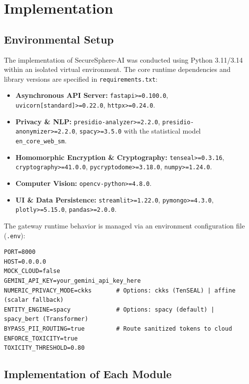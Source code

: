 \documentclass[12pt,a4paper,oneside]{report}
\numberwithin{equation}{chapter}
\begin{document}
\chapter{Implementation}

\section{Environmental Setup}
The implementation of SecureSphere-AI was conducted using Python 3.11/3.14 within an isolated virtual environment. The core runtime dependencies and library versions are specified in \texttt{requirements.txt}:
\begin{itemize}[leftmargin=*]
    \item \textbf{Asynchronous API Server:} \texttt{fastapi>=0.100.0}, \texttt{uvicorn[standard]>=0.22.0}, \texttt{httpx>=0.24.0}.
    \item \textbf{Privacy \& NLP:} \texttt{presidio-analyzer>=2.2.0}, \texttt{presidio-anonymizer>=2.2.0}, \texttt{spacy>=3.5.0} with the statistical model \texttt{en\_core\_web\_sm}.
    \item \textbf{Homomorphic Encryption \& Cryptography:} \texttt{tenseal>=0.3.16}, \texttt{cryptography>=41.0.0}, \texttt{pycryptodome>=3.18.0}, \texttt{numpy>=1.24.0}.
    \item \textbf{Computer Vision:} \texttt{opencv-python>=4.8.0}.
    \item \textbf{UI \& Data Persistence:} \texttt{streamlit>=1.22.0}, \texttt{pymongo>=4.3.0}, \texttt{plotly>=5.15.0}, \texttt{pandas>=2.0.0}.
\end{itemize}

The gateway runtime behavior is managed via an environment configuration file (\texttt{.env}):
\begin{verbatim}
PORT=8000
HOST=0.0.0.0
MOCK_CLOUD=false
GEMINI_API_KEY=your_gemini_api_key_here
NUMERIC_PRIVACY_MODE=ckks       # Options: ckks (TenSEAL) | affine (scalar fallback)
ENTITY_ENGINE=spacy             # Options: spacy (default) | spacy_bert (Transformer)
BYPASS_PII_ROUTING=true         # Route sanitized tokens to cloud
ENFORCE_TOXICITY=true
TOXICITY_THRESHOLD=0.80
\end{verbatim}

\section{Implementation of Each Module}
\end{document}
